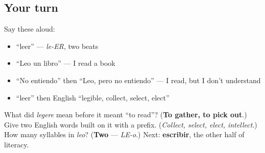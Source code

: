 \subsection*{Your turn}
Say these aloud:

\begin{itemize}
\raggedright
  \item \textquotedblleft{}leer\textquotedblright{} — \emph{le-ER}, two beats
  \item \textquotedblleft{}Leo un libro\textquotedblright{} — I read a book
  \item \textquotedblleft{}No entiendo\textquotedblright{} then \textquotedblleft{}Leo, pero no entiendo\textquotedblright{} — I read, but I don't understand
  \item \textquotedblleft{}leer\textquotedblright{} then English \textquotedblleft{}legible, collect, select, elect\textquotedblright{}
\end{itemize}

\begin{tcolorbox}[breakable,colback=teal!4,colframe=teal!35!black,title={Before you move on}]
What did \emph{legere} mean before it meant \textquotedblleft{}to read\textquotedblright{}? (\textbf{To gather, to pick out}.) Give two English words built on it with a prefix. (\emph{Collect, select, elect, intellect}.) How many syllables in \emph{leo}? (\textbf{Two} — \emph{LE-o}.) Next: \textbf{escribir}, the other half of literacy.
\end{tcolorbox}
